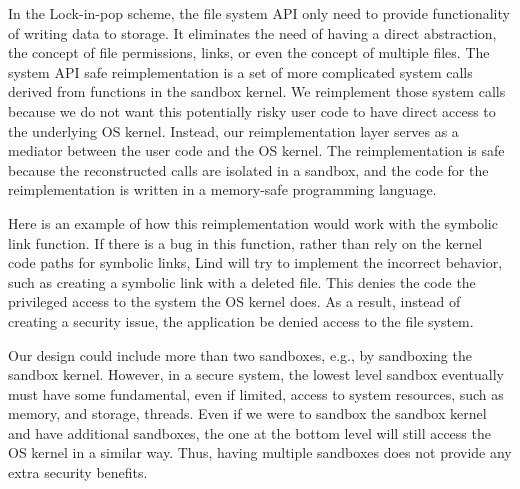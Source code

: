 In the Lock-in-pop scheme, the file system API only need
to provide functionality of writing data to storage. 
It eliminates the need of having a direct abstraction, the
concept of file permissions, links, or even the concept of multiple files.
The system API safe reimplementation is a set of more complicated system calls
derived from functions in the sandbox kernel.
We reimplement those system calls because we do not want this potentially risky user code
to have direct access to the underlying OS kernel.
Instead, our reimplementation layer serves as a mediator between the user code
and the OS kernel. The reimplementation is safe
because the reconstructed calls are isolated in a sandbox, and the code for the
reimplementation is written in a memory-safe programming language.

Here is an example of how this reimplementation would work with the symbolic link function.
If there is a bug in this function, rather than rely on the kernel code paths
for symbolic links, Lind will try to implement the incorrect behavior, such as creating a symbolic link 
with a deleted file. 
This denies the code the privileged access to the system the OS kernel does.
As a result, instead of creating a security issue, the application be denied access
to the file system.

Our design could include more than two sandboxes, e.g., by sandboxing the sandbox
kernel. However, in a secure system,
the lowest level sandbox eventually must have some fundamental,
even if limited, access to system resources, such as memory, and storage, threads.
Even if we were to sandbox the sandbox kernel and have additional sandboxes,
the one at the bottom level will still access the OS kernel in a similar way.
Thus, having multiple sandboxes does not provide any extra security benefits.